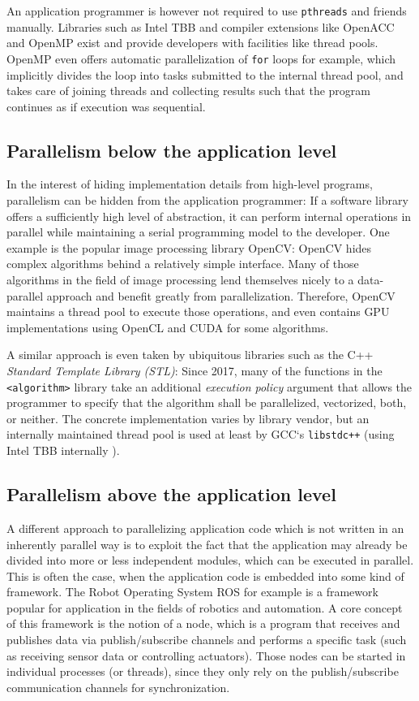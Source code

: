 \documentclass[BCOR20mm,DIV14,10pt,headinclude,footexclude,bibtotoc,liststotoc]{article}
\begin{document}
An application programmer is however not required to use \texttt{pthreads} and
friends manually. Libraries such as Intel TBB and compiler extensions like
OpenACC \cite{openacc} and OpenMP \cite{openmp} exist and provide developers
with facilities like thread pools. OpenMP even offers automatic parallelization
of \texttt{for} loops for example, which implicitly divides the loop into tasks
submitted to the internal thread pool, and takes care of joining threads and
collecting results such that the program continues as if execution was
sequential.

\subsection{Parallelism below the application level}
In the interest of hiding implementation details from high-level programs,
parallelism can be hidden from the application programmer: If a software library
offers a sufficiently high level of abstraction, it can perform internal
operations in parallel while maintaining a serial programming model to the
developer. One example is the popular image processing library OpenCV: OpenCV
hides complex algorithms behind a relatively simple interface. Many of those
algorithms in the field of image processing lend themselves nicely to a
data-parallel approach and benefit greatly from parallelization. Therefore,
OpenCV maintains a thread pool to execute those operations, and even contains
GPU implementations using OpenCL and CUDA for some algorithms.

A similar approach is even taken by ubiquitous libraries such as the C++
\emph{Standard Template Library (STL)}: Since 2017, many of the functions in the
\texttt{<algorithm>} library take an additional \textit{execution policy}
argument that allows the programmer to specify that the algorithm shall be
parallelized, vectorized, both, or neither. The concrete implementation varies
by library vendor, but an internally maintained thread pool is used at least by
GCC`s \texttt{libstdc++} (using Intel TBB internally \cite{libstdc++}).

\subsection{Parallelism above the application level}
A different approach to parallelizing application code which is not written in
an inherently parallel way is to exploit the fact that the application may
already be divided into more or less independent modules, which can be executed
in parallel. This is often the case, when the application code is embedded into
some kind of framework. The Robot Operating System ROS for example is a
framework popular for application in the fields of robotics and automation. A
core concept of this framework is the notion of a node, which is a program that
receives and publishes data via publish/subscribe channels and performs a
specific task (such as receiving sensor data or controlling actuators). Those
nodes can be started in individual processes (or threads), since they only rely
on the publish/subscribe communication channels for synchronization.
\end{document}
